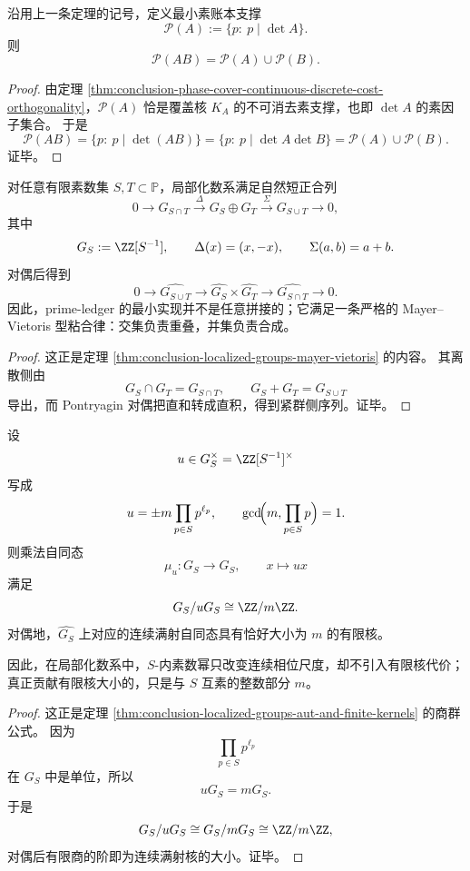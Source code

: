 \begin{corollary}\label{cor:conclusion-phase-cover-prime-ledger-support-union}
沿用上一条定理的记号，定义最小素账本支撑
\[
\mathcal P(A):=\{p:\ p\mid \det A\}.
\]
则
\[
\mathcal P(AB)=\mathcal P(A)\cup \mathcal P(B).
\]
\end{corollary}
\begin{proof}
由定理 \ref{thm:conclusion-phase-cover-continuous-discrete-cost-orthogonality}，\(\mathcal P(A)\) 恰是覆盖核 \(K_A\) 的不可消去素支撑，也即 \(\det A\) 的素因子集合。
于是
\[
\mathcal P(AB)
=
\{p:\ p\mid \det(AB)\}
=
\{p:\ p\mid \det A\det B\}
=
\mathcal P(A)\cup \mathcal P(B).
\]
证毕。
\end{proof}

\begin{theorem}\label{thm:conclusion-phase-cover-localized-prime-ledger-mayer-vietoris-gluing}
对任意有限素数集 \(S,T\subset \mathbb P\)，局部化数系满足自然短正合列
\[
0\longrightarrow G_{S\cap T}
\overset{\Delta}{\longrightarrow}
G_S\oplus G_T
\overset{\Sigma}{\longrightarrow}
G_{S\cup T}
\longrightarrow 0,
\]
其中
\[
G_S:=\ZZ[S^{-1}],
\qquad
\Delta(x)=(x,-x),
\qquad
\Sigma(a,b)=a+b.
\]
对偶后得到
\[
0\longrightarrow \widehat{G_{S\cup T}}
\longrightarrow
\widehat{G_S}\times \widehat{G_T}
\longrightarrow
\widehat{G_{S\cap T}}
\longrightarrow 0.
\]
因此，prime-ledger 的最小实现并不是任意拼接的；它满足一条严格的 Mayer--Vietoris 型粘合律：交集负责重叠，并集负责合成。
\end{theorem}
\begin{proof}
这正是定理 \ref{thm:conclusion-localized-groups-mayer-vietoris} 的内容。
其离散侧由
\[
G_S\cap G_T=G_{S\cap T},
\qquad
G_S+G_T=G_{S\cup T}
\]
导出，而 Pontryagin 对偶把直和转成直积，得到紧群侧序列。证毕。
\end{proof}

\begin{corollary}[局部化数系中有限核代价只来自素数外的整数部分]\label{cor:conclusion-phase-cover-localized-finite-kernel-only-outside-primes}
设
\[
u\in G_S^\times=\ZZ[S^{-1}]^\times
\]
写成
\[
u=\pm m\prod_{p\in S}p^{\ell_p},
\qquad
\gcd\!\Bigl(m,\prod_{p\in S}p\Bigr)=1.
\]
则乘法自同态
\[
\mu_u:G_S\to G_S,
\qquad
x\mapsto ux
\]
满足
\[
G_S/uG_S\cong \ZZ/m\ZZ.
\]
对偶地，\(\widehat{G_S}\) 上对应的连续满射自同态具有恰好大小为 \(m\) 的有限核。

因此，在局部化数系中，\(S\)-内素数幂只改变连续相位尺度，却不引入有限核代价；真正贡献有限核大小的，只是与 \(S\) 互素的整数部分 \(m\)。
\end{corollary}
\begin{proof}
这正是定理 \ref{thm:conclusion-localized-groups-aut-and-finite-kernels} 的商群公式。
因为
\[
\prod_{p\in S}p^{\ell_p}
\]
在 \(G_S\) 中是单位，所以
\[
uG_S=mG_S.
\]
于是
\[
G_S/uG_S\cong G_S/mG_S\cong \ZZ/m\ZZ,
\]
对偶后有限商的阶即为连续满射核的大小。证毕。
\end{proof}

